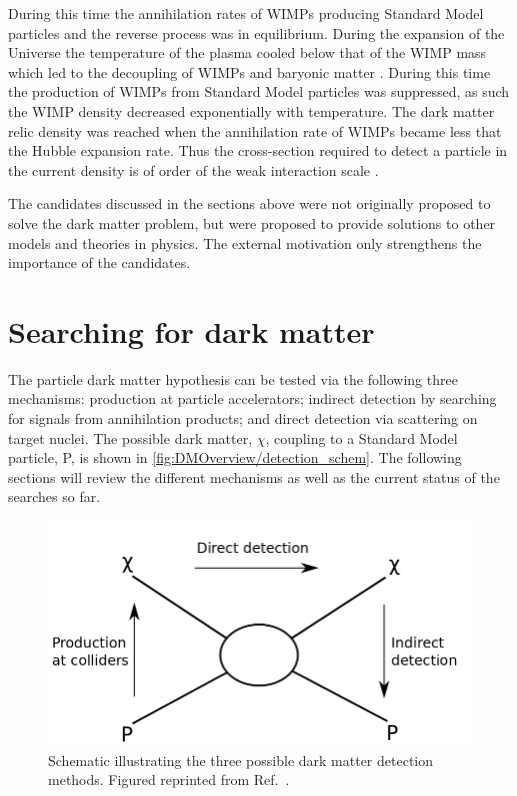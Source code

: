 During this time the annihilation rates of WIMPs producing Standard Model particles and the reverse process was in equilibrium. During the expansion of the Universe the temperature of the plasma cooled below that of the WIMP mass which led to the decoupling of WIMPs and baryonic matter \cite{DMProd}. During this time the production of WIMPs from Standard Model particles was suppressed, as such the WIMP density decreased exponentially with temperature. The dark matter relic density was reached when the annihilation rate of WIMPs became less that the Hubble expansion rate. Thus the cross-section required to detect a particle in the current density is of order of the weak interaction scale \cite{DMProd}. 
\fi

\begin{flushleft}
The candidates discussed in the sections above were not originally proposed to solve the dark matter problem, but were proposed to provide solutions to other models and theories in physics. The external motivation only strengthens the importance of the candidates.
\end{flushleft}

\section{Searching for dark matter}\label{sec:DMOverview/DetectionOfDM}
The particle dark matter hypothesis can be tested via the following three mechanisms: production at particle accelerators; indirect detection by searching for signals from annihilation products; and direct detection via scattering on target nuclei. The possible dark matter, $\chi$, coupling to a Standard Model particle, P, is shown in \autoref{fig:DMOverview/detection_schem}. The following sections will review the different mechanisms as well as the current status of the searches so far. 
\begin{figure}[h!]
	\centering
	\includegraphics[width=0.6\linewidth]{figures/DMOverview/Detection_schematic.png}
	\caption[Schematic illustrating the possible dark matter detection methods.]{Schematic illustrating the three possible dark matter detection methods. Figured reprinted from Ref.~\cite{DirectDetection2015}.}
	\label{fig:DMOverview/detection_schem}
\end{figure}

